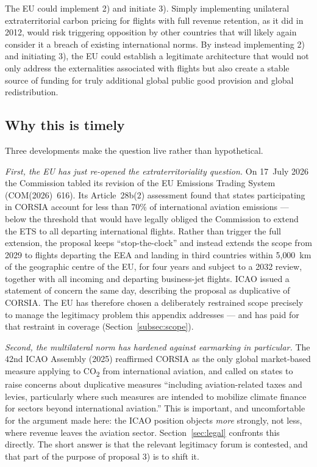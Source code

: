 \documentclass[11pt]{article}
\begin{document}
The EU could implement 2) and initiate 3). Simply implementing unilateral
extraterritorial carbon pricing for flights with full revenue retention, as it
did in 2012, would risk triggering opposition by other countries that will
likely again consider it a breach of existing international norms. By instead
implementing 2) and initiating 3), the EU could establish a legitimate
architecture that would not only address the externalities associated with
flights but also create a stable source of funding for truly additional global
public good provision and global redistribution.

\subsection{Why this is timely}
\label{subsec:timely}

Three developments make the question live rather than hypothetical.

\emph{First, the EU has just re-opened the extraterritoriality question.} On
17~July 2026 the Commission tabled its revision of the EU Emissions Trading
System (COM(2026)~616). Its Article~28b(2) assessment found that states
participating in CORSIA account for less than 70\% of international aviation
emissions --- below the threshold that would have legally obliged the Commission
to extend the ETS to all departing international flights. Rather than trigger
the full extension, the proposal keeps ``stop-the-clock'' and instead extends
the scope from 2029 to flights departing the EEA and landing in third countries
within 5{,}000~km of the geographic centre of the EU, for four years and subject
to a 2032 review, together with all incoming and departing business-jet flights.
ICAO issued a statement of concern the same day, describing the proposal as
duplicative of CORSIA. The EU has therefore chosen a deliberately restrained
scope precisely to manage the legitimacy problem this appendix addresses --- and
has paid for that restraint in coverage (Section~\ref{subsec:scope}).

\emph{Second, the multilateral norm has hardened against earmarking in
particular.} The 42nd ICAO Assembly (2025) reaffirmed CORSIA as the only global
market-based measure applying to CO\textsubscript{2} from international
aviation, and called on states to raise concerns about duplicative measures
``including aviation-related taxes and levies, particularly where such measures
are intended to mobilize climate finance for sectors beyond international
aviation.'' This is important, and uncomfortable for the argument made here: the
ICAO position objects \emph{more} strongly, not less, where revenue leaves the
aviation sector. Section~\ref{sec:legal} confronts this directly. The short
answer is that the relevant legitimacy forum is contested, and that part of the
purpose of proposal 3) is to shift it.
\end{document}
